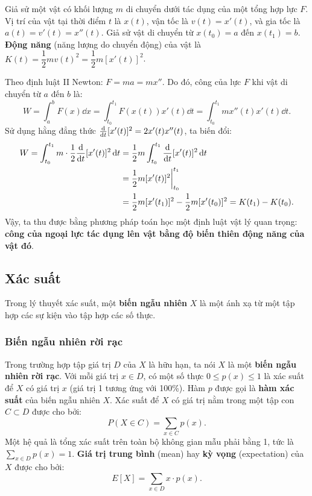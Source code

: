 \begin{example}
    Giả sử một vật có khối lượng $m$ di chuyển dưới tác dụng của một tổng hợp lực $F$. Vị trí của vật tại thời điểm $t$ là $x(t)$, vận tốc là $v(t) = x'(t)$, và gia tốc là $a(t) = v'(t) = x''(t)$. Giả sử vật di chuyển từ $x(t_0) = a$ đến $x(t_1) = b$. \textbf{Động năng} (năng lượng do chuyển động) của vật là $K(t) = \dfrac{1}{2}mv(t)^2 = \dfrac{1}{2}m[x'(t)]^2$.
    
    Theo định luật II Newton: $F = ma = mx''$. Do đó, công của lực $F$ khi vật di chuyển từ $a$ đến $b$ là:
    \[ W = \int_a^b F(x) \dd x = \int_{t_0}^{t_1} F(x(t)) x'(t) \dd t = \int_{t_0}^{t_1} m x''(t) x'(t) \dd t. \]
    Sử dụng hằng đẳng thức $\frac{\mathrm{d}}{\mathrm{d}t} [x'(t)]^2 = 2x'(t)x''(t)$, ta biến đổi:
    \begin{align*}
        W = \int_{t_0}^{t_1} m \cdot \dfrac{1}{2} \frac{\mathrm{d}}{\mathrm{d}t}[x'(t)]^2 \,\mathrm{d} t &= \dfrac{1}{2}m \int_{t_0}^{t_1} \frac{\mathrm{d}}{\mathrm{d}t}[x'(t)]^2 \,\mathrm{d} t \\
        &= \dfrac{1}{2}m [x'(t)]^2 \bigg|_{t_0}^{t_1} \\
        &= \dfrac{1}{2}m[x'(t_1)]^2 - \dfrac{1}{2}m[x'(t_0)]^2 = K(t_1) - K(t_0).
    \end{align*}
    Vậy, ta thu được bằng phương pháp toán học một định luật vật lý quan trọng: \textbf{công của ngoại lực tác dụng lên vật bằng độ biến thiên động năng của vật đó}.
\end{example}

\subsection{Xác suất}

Trong lý thuyết xác suất, một \textbf{biến ngẫu nhiên} $X$ là một ánh xạ từ một tập hợp các sự kiện vào tập hợp các số thực.

\subsubsection{Biến ngẫu nhiên rời rạc}
Trong trường hợp tập giá trị $D$ của $X$ là hữu hạn, ta nói $X$ là một \textbf{biến ngẫu nhiên rời rạc}. Với mỗi giá trị $x \in D$, có một số thực $0 \le p(x) \le 1$ là xác suất để $X$ có giá trị $x$ (giá trị 1 tương ứng với 100\%). Hàm $p$ được gọi là \textbf{hàm xác suất} của biến ngẫu nhiên $X$. Xác suất để $X$ có giá trị nằm trong một tập con $C \subset D$ được cho bởi:
\[ P(X \in C) = \sum_{x \in C} p(x). \]
Một hệ quả là tổng xác suất trên toàn bộ không gian mẫu phải bằng 1, tức là $\sum_{x \in D} p(x) = 1$. \textbf{Giá trị trung bình} (mean) hay \textbf{kỳ vọng} (expectation) của $X$ được cho bởi:
\[ E[X] = \sum_{x \in D} x \cdot p(x). \]

